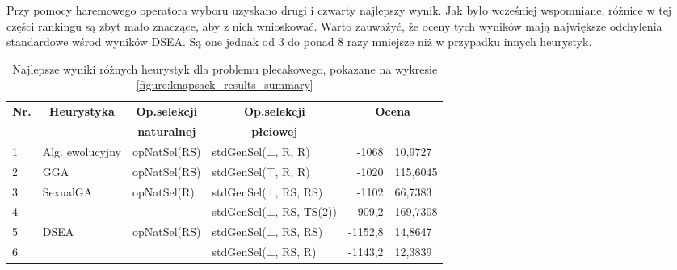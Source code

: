 \documentclass[./FM_mgr.tex]{subfiles}
\begin{document}
Przy pomocy haremowego operatora wyboru uzyskano drugi i czwarty najlepszy wynik.
Jak było wcześniej wspomniane, różnice w tej części rankingu są zbyt mało znaczące, aby z nich wnioskować.
Warto zauważyć, że oceny tych wyników mają największe odchylenia standardowe wśrod wyników DSEA.
Są one jednak od 3 do ponad 8 razy mniejsze niż w przypadku innych heurystyk.

\begin{table}[H]
	\centering
	\caption{Najlepsze wyniki różnych heurystyk dla problemu plecakowego, pokazane na wykresie \ref{figure:knapsack_results_summary} \label{table:knapsack_results_summary}}
	\begin{tabular}{|l|l|l|l|r@{$\pm$}l|}
		\hline
		\multicolumn{1}{|c|}{\multirow{2}{*}{{\bf Nr.}}} & \multicolumn{1}{c|}{\multirow{2}{*}{{\bf Heurystyka}}} & \multicolumn{1}{c|}{{\bf Op.selekcji}} & \multicolumn{1}{c|}{{\bf Op.selekcji}} & \multicolumn{2}{c|}{\multirow{2}{*}{{\bf Ocena}}} \\
		& \multicolumn{1}{c|}{}                                  & \multicolumn{1}{c|}{{\bf naturalnej}}    & \multicolumn{1}{c|}{{\bf płciowej}}  & \multicolumn{2}{c|}{}                             \\ \hline \hline
		1 & Alg. ewolucyjny                                         & opNatSel(RS)                           & stdGenSel($\bot$, R, R)                & -1068                   & 10,9727                 \\ \hline
		2 & GGA                                                     & opNatSel(RS)                           & stdGenSel($\top$, R, R)                & -1020                   & 115,6045                \\ \hline
		3 & \multirow{2}{*}{SexualGA}                               & \multirow{2}{*}{opNatSel(R)}           & stdGenSel($\bot$, RS, RS)              & -1102                   & 66,7383                 \\ \cline{1-1}\cline{4-6} 
		4 & &                                        & stdGenSel($\bot$, RS, TS(2))           & -909,2                  & 169,7308                \\ \hline
		5 & \multirow{6}{*}{DSEA}                                   & \multirow{6}{*}{opNatSel(RS)}          & stdGenSel($\bot$, RS, RS)              & -1152,8                 & 14,8647                 \\ \cline{1-1}\cline{4-6} 
		6 & &                                        & stdGenSel($\bot$, RS, R)               & -1143,2                 & 12,3839                 \\ \cline{1-1}\cline{4-6} 

\end{tabular}
\end{table}
\end{document}
